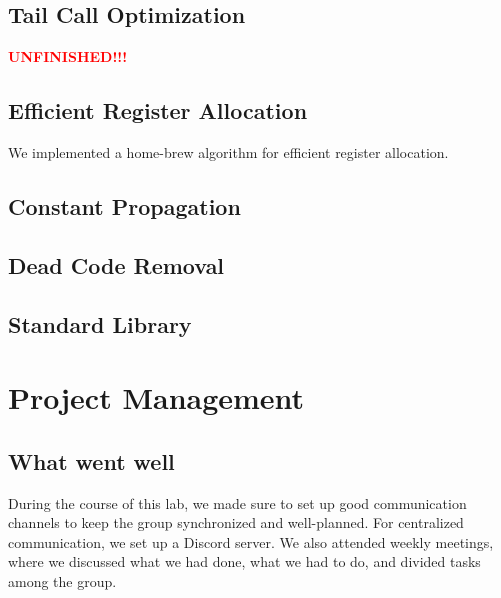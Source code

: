 \documentclass{article}
\newcommand{\unfinished}{\begin{huge} \textcolor{red}{\textbf{UNFINISHED!!!}} \end{huge}}
\begin{document}
        \subsection*{Tail Call Optimization}
        
        \unfinished
        
        \subsection*{Efficient Register Allocation}
        We implemented a home-brew algorithm for efficient register allocation.
        \subsection*{Constant Propagation}
        \subsection*{Dead Code Removal}
        \subsection*{Standard Library}
        
        

    
    \section*{Project Management}
        
        \subsection*{What went well}
        During the course of this lab, we made sure to set up good communication channels to keep the group synchronized and well-planned. For centralized communication, we set up a Discord server. We also attended weekly meetings, where we discussed what we had done, what we had to do, and divided tasks among the group.
        
\end{document}
